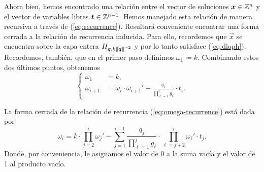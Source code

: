 Ahora bien, hemos encontrado una relación entre el vector de soluciones $\boldsymbol{x} \in \mathbb{Z}^n$ y el
vector de variables libres $\boldsymbol{t} \in \mathbb{Z}^{n-1}$. Hemos manejado esta relación de manera recursiva
a través de (\ref{eq:recurrence}). Resultará conveniente encontrar una forma cerrada a la relación
de recurrencia inducida. Para ello, recordemos que $\vec{x}$ se encuentra sobre la capa entera
$H_{\boldsymbol{q}, k\left\lVert \boldsymbol{q} \right\rVert^{-2}}$ y por lo tanto satisface (\ref{eq:dioph}). Recordemos, también,
que en el primer paso definimos $\omega_1 \coloneq k$. Combinando estos dos últimos puntos, obtenemos
\begin{equation}
	\label{eq:omega-recurrence}
	\begin{cases}
		\omega_1 &= k, \\
		\omega_{i + 1} &= \omega_i \cdot \omega_{i + 1}' - \frac{q_i}{\prod_{\ell=1}^{i}g_\ell} \cdot t_i.
	\end{cases}
\end{equation}
\begin{lemma}
	La forma cerrada de la relación de recurrencia (\ref{eq:omega-recurrence}) está dada por
	\begin{equation}
		\label{eq:omega-formula}
		\omega_i =
		k \cdot \prod_{j=2}^{i} \omega_j'
		- \sum_{j=1}^{i - 1}\frac{q_j}{\prod_{\ell=1}^{j}g_\ell}
		\cdot \prod_{\ell=j+2}^{i}\omega_\ell' \cdot t_j.
	\end{equation}
	Donde, por conveniencia, le asignamos el valor de 0 a la suma vacía y el valor de 1 al producto
	vacío.
\end{lemma}
